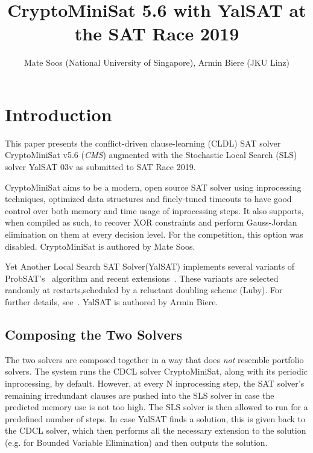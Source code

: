 \documentclass[final]{ieee}
\begin{document}
\title{CryptoMiniSat 5.6 with YalSAT at the SAT Race 2019}
\author{Mate Soos (National University of Singapore), Armin Biere (JKU Linz)}

\maketitle
\thispagestyle{empty}
\pagestyle{empty}

\section{Introduction}
This paper presents the conflict-driven clause-learning (CLDL) SAT solver CryptoMiniSat v5.6 (\emph{CMS}) augmented with the Stochastic Local Search (SLS) solver YalSAT 03v as submitted to SAT Race 2019.

CryptoMiniSat aims to be a modern, open source SAT solver using inprocessing techniques, optimized data structures and finely-tuned timeouts to have good control over both memory and time usage of inprocessing steps. It also supports, when compiled as such, to recover XOR constraints and perform Gauss-Jordan elimination on them at every decision level. For the competition, this option was disabled. CryptoMiniSat is authored by Mate Soos.

Yet Another Local Search SAT Solver(YalSAT) implements several variants of ProbSAT's~\cite{probsat} algorithm and recent extensions~\cite{balint-improving-sls}. These variants are selected randomly at restarts,scheduled by a reluctant doubling scheme (Luby). For further details, see~\cite{sat-comp-2014-armin}. YalSAT is authored by Armin Biere.

\subsection{Composing the Two Solvers}
The two solvers are composed together in a way that does \emph{not} resemble portfolio solvers. The system runs the CDCL solver CryptoMiniSat, along with its periodic inprocessing, by default. However, at every N inprocessing step, the SAT solver's remaining irredundant clauses are pushed into the SLS solver in case the predicted memory use is not too high. The SLS solver is then allowed to run for a predefined number of steps. In case YalSAT finds a solution, this is given back to the CDCL solver, which then performs all the necessary extension to the solution (e.g. for Bounded Variable Elimination) and then outputs the solution.
\end{document}
